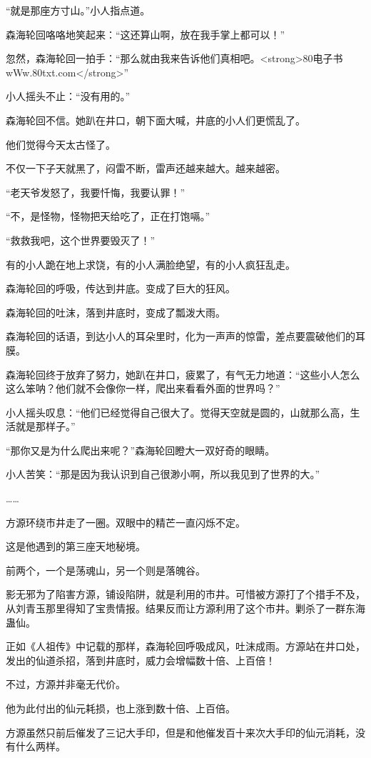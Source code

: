 \begin{this_body}
“就是那座方寸山。”小人指点道。

森海轮回咯咯地笑起来：“这还算山啊，放在我手掌上都可以！”

忽然，森海轮回一拍手：“那么就由我来告诉他们真相吧。<strong>80电子书wWw.80txt.com</strong>”

小人摇头不止：“没有用的。”

森海轮回不信。她趴在井口，朝下面大喊，井底的小人们更慌乱了。

他们觉得今天太古怪了。

不仅一下子天就黑了，闷雷不断，雷声还越来越大。越来越密。

“老天爷发怒了，我要忏悔，我要认罪！”

“不，是怪物，怪物把天给吃了，正在打饱嗝。”

“救救我吧，这个世界要毁灭了！”

有的小人跪在地上求饶，有的小人满脸绝望，有的小人疯狂乱走。

森海轮回的呼吸，传达到井底。变成了巨大的狂风。

森海轮回的吐沫，落到井底时，变成了瓢泼大雨。

森海轮回的话语，到达小人的耳朵里时，化为一声声的惊雷，差点要震破他们的耳膜。

森海轮回终于放弃了努力，她趴在井口，疲累了，有气无力地道：“这些小人怎么这么笨呐？他们就不会像你一样，爬出来看看外面的世界吗？”

小人摇头叹息：“他们已经觉得自己很大了。觉得天空就是圆的，山就那么高，生活就是那样子。”

“那你又是为什么爬出来呢？”森海轮回瞪大一双好奇的眼睛。

小人苦笑：“那是因为我认识到自己很渺小啊，所以我见到了世界的大。”

……

方源环绕市井走了一圈。双眼中的精芒一直闪烁不定。

这是他遇到的第三座天地秘境。

前两个，一个是荡魂山，另一个则是落魄谷。

影无邪为了陷害方源，铺设陷阱，就是利用的市井。可惜被方源打了个措手不及，从刘青玉那里得知了宝贵情报。结果反而让方源利用了这个市井。剿杀了一群东海蛊仙。

正如《人祖传》中记载的那样，森海轮回呼吸成风，吐沫成雨。方源站在井口处，发出的仙道杀招，落到井底时，威力会增幅数十倍、上百倍！

不过，方源并非毫无代价。

他为此付出的仙元耗损，也上涨到数十倍、上百倍。

方源虽然只前后催发了三记大手印，但是和他催发百十来次大手印的仙元消耗，没有什么两样。


\end{this_body}
